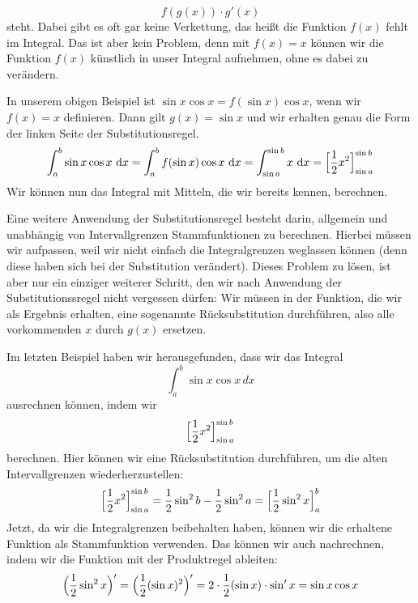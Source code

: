 \documentclass[../../main.tex]{subfiles}
\begin{document}
\[f(g(x))\cdot g'(x)\]
steht. Dabei gibt es oft gar keine Verkettung, das heißt die Funktion $f(x)$ fehlt im Integral. Das ist aber kein Problem,
denn mit $f(x)=x$ können wir die Funktion $f(x)$ künstlich in unser Integral aufnehmen, ohne es dabei zu verändern.
\begin{example}{}
    In unserem obigen Beispiel ist $\sin x\cos x=f(\sin x)\cos x$, wenn wir $f(x)=x$ definieren. Dann gilt $g(x)=\sin x$ 
    und wir erhalten genau die Form der linken Seite der Substitutionsregel.
    \[\int_a^b \sin x\cos x\mathop{}\mathrm{d} x=\int_a^b f(\sin x)\cos x\mathop{}\mathrm{d} x=\int_{\sin a}^{\sin b} x\mathop{}\mathrm{d} x=\Bigl[\frac{1}{2}x^2\Bigr]_{\sin a}^{\sin b}\]
    Wir können nun das Integral mit Mitteln, die wir bereits kennen, berechnen.
\end{example}

Eine weitere Anwendung der Substitutionsregel besteht darin, allgemein und unabhängig von Intervallgrenzen Stammfunktionen 
zu berechnen. Hierbei müssen wir aufpassen, weil wir nicht einfach die Integralgrenzen weglassen können (denn diese haben sich
bei der Substitution verändert). Dieses Problem zu lösen, ist aber nur ein einziger weiterer Schritt, den wir nach Anwendung der
Substitutionssregel nicht vergessen dürfen: Wir müssen in der Funktion, die wir als Ergebnis erhalten, eine sogenannte 
Rücksubstitution durchführen, also alle vorkommenden $x$ durch $g(x)$ ersetzen.
\begin{example}{}
    Im letzten Beispiel haben wir herausgefunden, dass wir das Integral
    \[\int_a^b\sin x\cos x\,dx\]
    ausrechnen können, indem wir
    \[\Bigl[\frac{1}{2}x^2\Bigr]_{\sin a}^{\sin b}\]
    berechnen. Hier können wir eine Rücksubstitution durchführen, um die alten Intervallgrenzen wiederherzustellen:
    \[\Bigl[\frac{1}{2}x^2\Bigr]_{\sin a}^{\sin b}=\frac{1}{2}\sin^2b-\frac{1}{2}\sin^2a=\Bigl[\frac{1}{2}\sin^2x\Bigr]_a^b\]
    Jetzt, da wir die Integralgrenzen beibehalten haben, können wir die erhaltene Funktion als Stammfunktion verwenden. 
    Das können wir auch nachrechnen, indem wir die Funktion mit der Produktregel ableiten: 
    \[\Bigl(\frac{1}{2}\sin^2 x\Bigr)'=\Bigl(\frac{1}{2}(\sin x)^2\Bigr)'=2\cdot\frac{1}{2}(\sin x)\cdot\sin'x=\sin x\cos x\]
\end{example}
\end{document}
